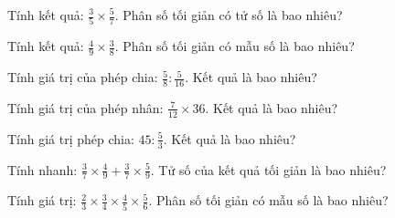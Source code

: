 
\begin{ex}
  Tính kết quả: $\frac{3}{5} \times \frac{5}{7}$. Phân số tối giản có tử số là bao nhiêu?
\end{ex}

\begin{ex}
  Tính kết quả: $\frac{4}{9} \times \frac{3}{8}$. Phân số tối giản có mẫu số là bao nhiêu?
\end{ex}

\begin{ex}
  Tính giá trị của phép chia: $\frac{5}{8} : \frac{5}{16}$. Kết quả là bao nhiêu?
\end{ex}

\begin{ex}
  Tính giá trị của phép nhân: $\frac{7}{12} \times 36$. Kết quả là bao nhiêu?
\end{ex}

\begin{ex}
  Tính giá trị phép chia: $45 : \frac{5}{3}$. Kết quả là bao nhiêu?
\end{ex}

\begin{ex}
  Tính nhanh: $\frac{3}{7} \times \frac{4}{9} + \frac{3}{7} \times \frac{5}{9}$. Tử số của kết quả tối giản là bao nhiêu?
\end{ex}

\begin{ex}
  Tính giá trị: $\frac{2}{3} \times \frac{3}{4} \times \frac{4}{5} \times \frac{5}{6}$. Phân số tối giản có mẫu số là bao nhiêu?
\end{ex}


